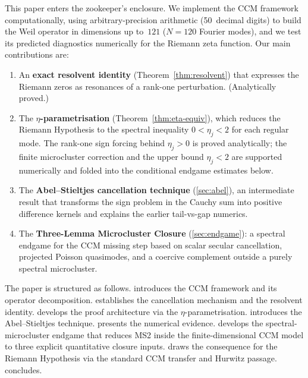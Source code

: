 \documentclass[12pt,a4paper]{article}
\theoremstyle{definition}
\theoremstyle{remark}
\begin{document}
This paper enters the zookeeper's enclosure.
We implement the CCM framework computationally, using arbitrary-precision
arithmetic (50~decimal digits) to build the Weil operator in dimensions
up to~$121$ ($N = 120$ Fourier modes), and we test its predicted
diagnostics numerically for the Riemann zeta function.
Our main contributions are:

\begin{enumerate}[label=(\roman*)]
\item An \textbf{exact resolvent identity} (Theorem~\ref{thm:resolvent})
  that expresses the Riemann zeros as resonances of a rank-one perturbation.
  (Analytically proved.)
\item The \textbf{$\eta$-parametrisation} (Theorem~\ref{thm:eta-equiv}),
  which reduces the Riemann Hypothesis to the spectral inequality
  $0 < \eta_j < 2$ for each regular mode.  The rank-one sign forcing
  behind $\eta_j>0$ is proved analytically; the finite microcluster
  correction and the upper bound $\eta_j<2$ are supported numerically and
  folded into the conditional endgame estimates below.
\item The \textbf{Abel--Stieltjes cancellation technique}
  (\cref{sec:abel}), an intermediate result that transforms the sign
  problem in the Cauchy sum into positive difference kernels and
  explains the earlier tail-vs-gap numerics.
\item The \textbf{Three-Lemma Microcluster Closure}
  (\cref{sec:endgame}): a spectral endgame for the CCM missing step
  based on scalar secular cancellation, projected Poisson quasimodes,
  and a coercive complement outside a purely spectral microcluster.
\end{enumerate}

The paper is structured as follows.
 introduces the CCM framework and its operator
decomposition.
 establishes the cancellation mechanism and the
resolvent identity.
 develops the proof architecture via the
$\eta$-parametrisation.
 introduces the Abel--Stieltjes technique.
 presents the numerical evidence.
 develops the spectral-microcluster endgame that
reduces MS2 inside the finite-dimensional CCM model to three explicit
quantitative closure inputs.
 draws the consequence for the Riemann Hypothesis via
the standard CCM transfer and Hurwitz passage.
 concludes.

\end{document}
